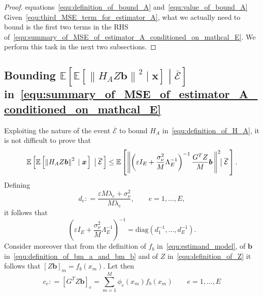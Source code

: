 \documentclass[10pt,twocolumn,twoside]{IEEEtran}					%
\theoremstyle	{plain}
\newcommand{\DiagonalMatrixOf}		[1]	{\mathrm{diag} \left( #1 \right)}
\newcommand{\DefinedAs}			[0]	{\mathrel{\mathop:}=}
\newcommand{\Expectation}					[0]	{\mathbb{E}}
\newcommand{\ExpectationOf}					[1]	{\Expectation \left[ #1 \right]}
\newcommand{\ExpectationOfGiven}			[2]	{\ExpectationOf{ #1 \; \left| \; #2 \right. }}
\begin{document}
\begin{proof}{equations~\eqref{equ:definition_of_bound_A} and~\eqref{equ:value_of_bound_A}}
Given~\eqref{equ:third_MSE_term_for_estimator_A}, what we actually need to bound is the first two terms in the \ac{RHS} of~\eqref{equ:summary_of_MSE_of_estimator_A_conditioned_on_mathcal_E}. We perform this task in the next two subsections.

\end{proof}

\subsection*{Bounding $\ExpectationOfGiven{\ExpectationOfGiven{\left\| H_{A} Z \bm{b} \right\|^{2}}{\bm{x}}}{\overline{\mathcal{E}}}$ in~\eqref{equ:summary_of_MSE_of_estimator_A_conditioned_on_mathcal_E}}
\label{ssec:characterization_of_first_term_of_f_A_conditioned_on_mathcal_E}

Exploiting the nature of the event $\overline{\mathcal{E}}$ to bound $H_{A}$ in~\eqref{equ:definition_of_H_A}, it is not difficult to prove that
%
\begin{equation} \footnotesize
	\ExpectationOfGiven{\ExpectationOfGiven{\left\| H_{A} Z \bm{b} \right\|^{2}}{\bm{x}}}{\overline{\mathcal{E}}}
	\leq
	\ExpectationOfGiven
	{
		\left\|
		\left( \varepsilon I_{E} + \frac{\sigma^{2}_{\nu}}{M} \Lambda^{-1}_{E} \right)^{-1}
			\frac{G^{T} Z}{M} \bm{b} \,
		\right\|^{2}
		\hspace{-0.2cm}
	}
	{\overline{\mathcal{E}}} .
	\label{equ:decomposition_of_second_term_of_the_error_for_estimator_A}
\end{equation}
%
Defining
%
\begin{equation}
	d_{e}
	\DefinedAs
	\frac{ \varepsilon M \lambda_{e} + \sigma^{2}_{\nu} }{ M \lambda_{e} },
	\qquad
	e = 1, \ldots, E,
	\label{equ:definition_of_d_e}
\end{equation}
%
it follows that 
%
\begin{equation}
	\left( \varepsilon I_{E} + \frac{\sigma^{2}_{\nu}}{M} \Lambda^{-1}_{E} \right)^{-1}
	=
	\DiagonalMatrixOf{ d_{1}^{-1}, \ldots, d_{E}^{-1} } .
	\label{equ:rewriting_of_varespilonIplusthings}
\end{equation}
%
Consider moreover that from the definition of $f_{b}$ in~\eqref{equ:estimand_model}, of $\bm{b}$ in~\eqref{equ:definition_of_bm_a_and_bm_b} and of $Z$ in~\eqref{equ:definition_of_Z} it follows that $\left[ Z \bm{b} \right]_{m} = f_{b} \left( x_{m} \right)$. Let then
%
\begin{equation}
	c_{e}
	\DefinedAs
	\left[ G^{T} Z \bm{b} \right]_{e}
	=
	\sum_{m = 1}^{M} \phi_{e} \left( x_{m} \right) f_{b} \left( x_{m} \right)
	\qquad
	e = 1, \ldots, E
	\label{equ:definition_of_c_e}
\end{equation}
\end{document}
